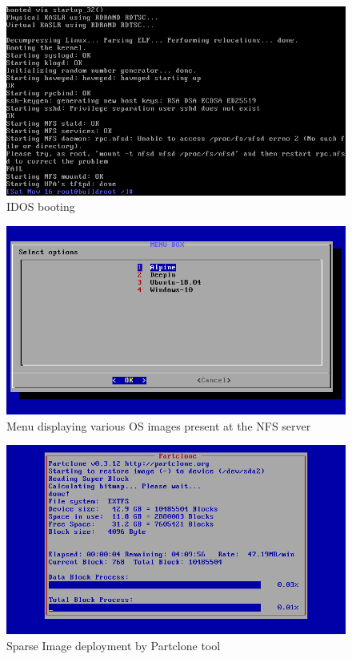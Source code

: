 \documentclass[a4paper,12pt]{article}
\begin{document}
\begin{figure}[h!]
    \centering
    \includegraphics[width=\linewidth]{booting_IDOS.png}
    \caption{IDOS booting}
    \label{b_IDOS}
\end{figure}
\begin{figure}[h!]
    \centering
    \includegraphics[width=\linewidth]{menu.png}
    \caption{Menu displaying various OS images present at the NFS server}
    \label{Menu}
\end{figure}
\begin{figure}[h!]
    \centering
    \includegraphics[width=\linewidth]{partclone.png}
    \caption{Sparse Image deployment by Partclone tool}
    \label{partclone}
\end{figure}
\end{document}
